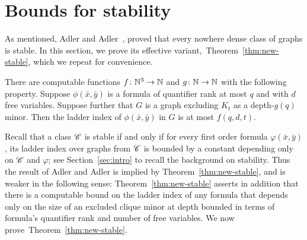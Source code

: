 
\section{Bounds for stability}\label{sec:stable}
As mentioned, Adler and Adler~\cite{adler2014interpreting}, 
proved that every nowhere dense class of graphs is stable. In this section,
we prove its effective variant,~Theorem~\ref{thm:new-stable}, which 
we repeat for convenience.
 \setcounter{aux}{\value{theorem}}
 \setcounter{theorem}{\value{stable}}
  \setcounter{auxsec}{\value{section}}
 \setcounter{section}{1}
 \begin{theorem}
 There are computable functions $f\colon \mathbb{N}^3\to\mathbb{N}$ and $g\colon\mathbb{N}\to\mathbb{N}$ with the following property.
 Suppose $\phi(\bar x,\bar y)$ is a formula of quantifier rank at most $q$ and with $d$ free variables.
 Suppose further that $G$ is a graph excluding $K_t$ as a depth-$g(q)$ minor. Then the ladder index of $\phi(\bar x,\bar y)$ in $G$ is at most $f(q,d,t)$.
 \end{theorem}
 \setcounter{theorem}{\value{aux}}
 \setcounter{section}{\value{auxsec}}

Recall that a class $\mathscr{C}$ is stable if and only if for every first order formula $\varphi(\bar x,\bar y)$, 
its ladder index over graphs from $\mathscr{C}$ is bounded by a constant depending only on $\mathscr{C}$ and $\varphi$;
see Section~\ref{sec:intro} to recall the background on stability.
Thus the result of Adler and Adler is implied by Theorem~\ref{thm:new-stable},
and is weaker in the following sense: Theorem~\ref{thm:new-stable} asserts in addition that there is a computable bound on the ladder index
of any formula that depends only on the size of an excluded clique minor at depth bounded in terms of formula's quantifier rank and number of free variables. 
We now prove~Theorem~\ref{thm:new-stable}.

